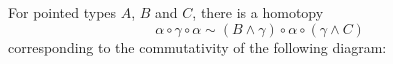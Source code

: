 \documentclass{article}
\newcommand{\smsh}{\wedge}
\renewcommand{\o}{\ensuremath{\circ}}
\begin{document}
\begin{thm}\label{thm:smash-associativity-braiding}
	For pointed types $A$, $B$ and $C$, there is a homotopy
	\[\alpha \o \gamma \o \alpha \sim (B \smsh \gamma) \o \alpha \o (\gamma \smsh C)\]
	corresponding to the commutativity of the following diagram:
	\begin{center}
	\end{center}
\end{thm}
\end{document}
